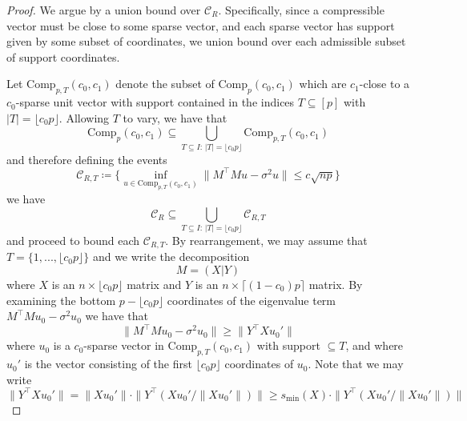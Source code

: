 \documentclass[11pt]{article}
\numberwithin{equation}{section}
\theoremstyle{remark}
\newcommand{\Comp}{\mathrm{Comp}}
\newcommand{\MinSingVal}{s_{\mathrm{min}}}
\begin{document}
\begin{proof}
    We argue by a union bound over $\mathcal{C}_R$. Specifically, since a compressible vector must be close to some sparse vector, and each sparse vector has support given by some subset of coordinates, we union bound over each admissible subset of support coordinates.  
    
    Let $\Comp_{p, T}(c_0, c_1)$ denote the subset of $\Comp_{p}(c_0, c_1)$ which are $c_1$-close to a $c_0$-sparse unit vector with support contained in the indices $T \subseteq [p]$ with $|T| = \lfloor c_0 p \rfloor$. Allowing $T$ to vary, we have that
    \begin{equation*}
        \Comp_{p}(c_0, c_1) \subseteq \bigcup_{T \subseteq I : \, |T| = \lfloor c_0 p \rfloor}\Comp_{p, T}(c_0, c_1)
    \end{equation*}
    and therefore defining the events 
    \begin{equation*}
        \mathcal{C}_{R, T} \coloneqq \bigg\{ \inf_{u \in \Comp_{p, T}(c_0, c_1)}\| M^\top M u - \sigma^2 u \| \leq c \sqrt{np} \bigg\}
    \end{equation*}
    we have 
    \begin{equation*}
        \mathcal{C}_R \subseteq \bigcup_{T \subseteq I : \, |T| = \lfloor c_0 p \rfloor}\mathcal{C}_{R, T}
    \end{equation*}
    and proceed to bound each $\mathcal{C}_{R, T}$. By rearrangement, we may assume that $T = \{ 1, ..., \lfloor c_0 p \rfloor \}$ and we write the decomposition 
    \begin{equation*}
        M = (X | Y)
    \end{equation*}
    where $X$ is an $n \times \lfloor c_0 p \rfloor$ matrix and $Y$ is an $n \times \lceil (1 - c_0) p \rceil$ matrix. By examining the bottom $p - \lfloor c_0 p \rfloor$ coordinates of the eigenvalue term $M^\top M u_0 - \sigma^2 u_0$ we have that
    \begin{equation*}
        \| M^\top  M u_0 - \sigma^2 u_0 \| \geq \|Y^\top X u_0'\|
    \end{equation*}
    where $u_0$ is a $c_0$-sparse vector in $\Comp_{p, T}(c_0, c_1)$ with support $\subseteq T$, and where $u_0'$ is the vector consisting of the first $\lfloor c_0 p \rfloor$ coordinates of $u_0$. Note that we may write 
    \begin{equation}\label{eq:Ytran-X-u0prime}
        \|Y^\top  X u_0'\| = \|X u_0' \| \cdot \|Y^\top (X u_0'/\|X u_0'\|)\| \geq \MinSingVal(X) \cdot \|Y^\top (X u_0'/\|X u_0'\|)\|
    \end{equation}

\end{proof}
\end{document}
